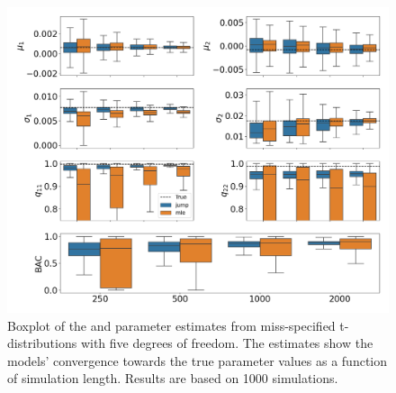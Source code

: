 \begin{figure}[H] 
    \centering
    \includegraphics[width=1\textwidth]{analysis/model_convergence/images/simulation_t_box.png}
    
    \caption [Boxplot of \mle and \jump parameter estimates from miss-specified conditional t-distributions with five degrees of freedom] {Boxplot of the \mle and \jump parameter estimates from miss-specified t-distributions with five degrees of freedom. The estimates show the models' convergence towards the true parameter values as a function of simulation length. Results are based on 1000 simulations.}
    \label{fig:jump_t_box}
\end{figure}

